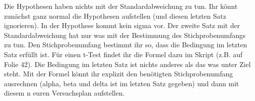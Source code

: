 \documentclass[ ngerman, fontsize= 12pt, paper=a4, headings=big, titlepage=true]{article}
\begin{document}
\begin{enumerate}[-]
\begin{enumerate}[*]
		
	Die Hypothesen haben nichts mit der Standardabweichung zu tun. Ihr könnt
zunächst ganz normal die Hypothesen aufstellen (und diesen letzten Satz
ignorieren).
In der Hypothese kommt kein sigma vor.
Der zweite Satz mit der Standardabweichung hat nur was mit der Bestimmung
des Stichprobenumfangs zu tun.
Den Stichprobenumfang bestimmt ihr so, dass die Bedingung im letzten Satz
erfüllt ist.
Für einen t-Test findet ihr die Formel dazu im Skript (z.B. auf Folie 42).
Die Bedingung im letzten Satz ist nichts anderes als das was unter Ziel
steht.
Mit der Formel könnt ihr explizit den benötigten Stichprobenumfang
ausrechnen (alpha, beta und delta ist im letzten Satz gegeben) und dann
mit diesem n euren Versuchsplan aufstellen.
	\end{enumerate}
\end{enumerate}
\end{document}
